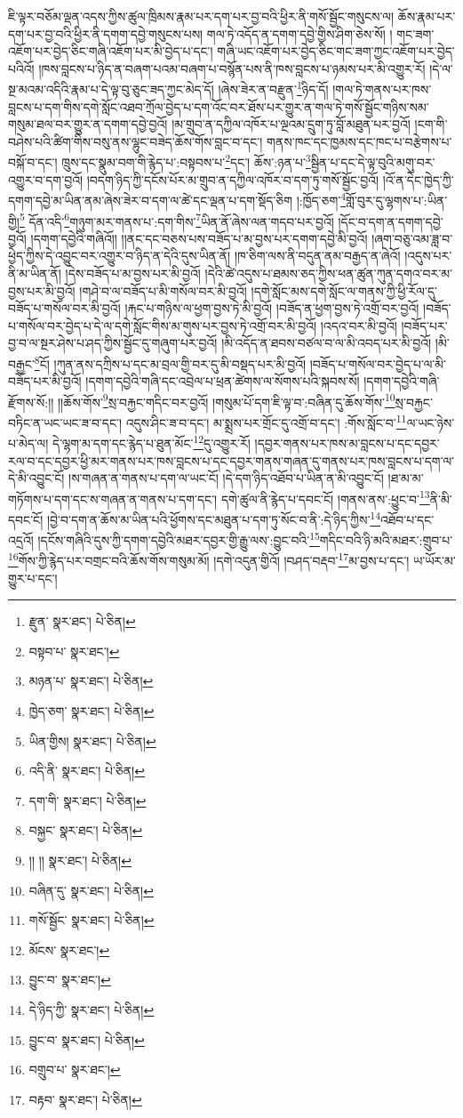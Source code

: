 ཇི་ལྟར་བཅོམ་ལྡན་འདས་ཀྱིས་ཚུལ་ཁྲིམས་རྣམ་པར་དག་པར་བྱ་བའི་ཕྱིར་ནི་གསོ་སྦྱོང་གསུངས་ལ། ཆོས་རྣམ་པར་དག་པར་བྱ་བའི་ཕྱིར་ནི་དགག་དབྱེ་གསུངས་པས། གལ་ཏེ་འདོད་ན་དགག་དབྱེ་གྱིས་ཤིག་ཅེས་སོ། །
གང་ཟག་འཇོག་པར་བྱེད་ཅིང་གཞི་འཇོག་པར་མི་བྱེད་པ་དང་། གཞི་ཡང་འཇོག་པར་བྱེད་ཅིང་གང་ཟག་ཀྱང་འཇོག་པར་བྱེད་པའིའོ། །ཁས་བླངས་པ་ཉིད་ན་བཞག་པའམ་བཞག་པ་བསྙོན་པས་ནི་ཁས་བླངས་པ་ཉམས་པར་མི་འགྱུར་རོ། །དེ་ལ་སྔ་མའམ་འདིའི་རྣམ་པ་དེ་ལྟ་བུ་ཅུང་ཟད་ཀྱང་མེད་དོ། །ཞེས་ཟེར་ན་བརྫུན་\footnote{རྫུན་  སྣར་ཐང་།  པེ་ཅིན། }ཉིད་དོ། །གལ་ཏེ་གནས་པར་ཁས་བླངས་པ་དག་གིས་དགེ་སློང་འཐབ་ཀྲོལ་བྱེད་པ་དག་འོང་བར་ཐོས་པར་གྱུར་ན་གལ་ཏེ་གསོ་སྦྱོང་གཉིས་སམ་གསུམ་ཐལ་བར་གྱུར་ན་དགག་དབྱེ་བྱའོ། །མ་གྲུབ་ན་དཀྱིལ་འཁོར་པ་ལྔའམ་དྲུག་ཏུ་བློ་མཐུན་པར་བྱའོ། །ངག་གི་བཤེས་པའི་ཚིག་གིས་བསུ་ནས་ལྷུང་བཟེད་ཆོས་གོས་བླང་བ་དང་། གནས་ཁང་དང་ཁྱམས་དང་ཁང་པ་བརྩེགས་པ་བསྐོ་བ་དང་། ཁྲུས་དང་སྣུམ་བག་གི་རྙེད་པ་:བསྟབས་པ་\footnote{བསྟབ་པ་  སྣར་ཐང་། }དང་། ཆོས་:ཉན་པ་\footnote{མཉན་པ་  སྣར་ཐང་།  པེ་ཅིན། }སྦྱིན་པ་དང་དེ་ལྟ་བུའི་མགུ་བར་འགྱུར་བ་དག་བྱའོ། །བདག་ཉིད་ཀྱི་དངོས་པོར་མ་གྲུབ་ན་དཀྱིལ་འཁོར་བ་དག་ཏུ་གསོ་སྦྱོང་བྱའོ། །འོ་ན་དེང་ཁྱེད་ཀྱི་དགག་དབྱེ་མ་ཡིན་ནམ་ཞེས་ཟེར་བ་དག་ལ་ཚེ་དང་ལྡན་པ་དག་སྡོད་ཅིག །:ཁྱོད་ཅག་\footnote{ཁྱེད་ཅག་  སྣར་ཐང་།  པེ་ཅིན། }གློ་བུར་དུ་ལྷགས་པ་:ཡིན་གྱི།\footnote{ཡིན་གྱིས།  སྣར་ཐང་།  པེ་ཅིན། } དོན་འདི་\footnote{འདི་ནི་  སྣར་ཐང་།  པེ་ཅིན། }གཉུག་མར་གནས་པ་:དག་གིས་\footnote{དག་གི་  སྣར་ཐང་།  པེ་ཅིན། }ཡིན་ནོ་ཞེས་ལན་གདབ་པར་བྱའོ། །དོང་བ་དག་ན་དགག་དབྱེ་བྱའོ། །དགག་དབྱེའི་གཞིའོ།། །།ནང་དང་བཅས་པས་བཟོད་པ་མ་བྱས་པར་དགག་དབྱེ་མི་བྱའོ། །ཞག་བཅུ་འམ་ཟླ་བ་ཕྱེད་ཀྱིས་དེ་འབྱུང་བར་འགྱུར་བ་ཉིད་ན་དེའི་དུས་ཡིན་ནོ། །ཁ་ཅིག་ལས་ནི་བདུན་ནམ་བརྒྱད་ན་ཞེའོ། །འདུས་པར་ནི་མ་ཡིན་ནོ། །དེས་བཟོད་པ་མ་བྱས་པར་མི་བྱའོ། །དེའི་ཚེ་འདུས་པ་ཐམས་ཅད་ཀྱིས་ཕན་ཚུན་ཀུན་དགའ་བར་མ་བྱས་པར་མི་བྱའོ། །གཤེ་བ་ལ་བཟོད་པ་མི་གསོལ་བར་མི་བྱའོ། །དགེ་སློང་མས་དགེ་སློང་ལ་གནས་ཀྱི་ཕྱི་རོལ་དུ་བཟོད་པ་གསོལ་བར་མི་བྱའོ། །རྐང་པ་གཉིས་ལ་ཕྱག་བྱས་ཏེ་མི་བྱའོ། །བཟོད་ན་ཕྱག་བྱས་ཏེ་འགྲོ་བར་བྱའོ། །བཟོད་པ་གསོལ་བར་བྱེད་པ་དེ་ལ་དགེ་སློང་གིས་མ་གུས་པར་བྱས་ཏེ་འགྲོ་བར་མི་བྱའོ། །འདའ་བར་མི་བྱའོ། །བཟོད་པར་བྱ་བ་ལ་སྔར་ཤེས་པ་ཤད་ཀྱིས་སྦྱོང་དུ་གཞུག་པར་བྱའོ། །མི་འདོད་ན་ཐབས་བཙལ་བ་ལ་མི་འབད་པར་མི་བྱའོ། །མི་བརྒྱང་\footnote{བསྐྱང་  སྣར་ཐང་།  པེ་ཅིན། }ངོ། །ཀུན་ནས་དཀྲིས་པ་དང་མ་བྲལ་གྱི་བར་དུ་མི་བསྡད་པར་མི་བྱའོ། །བཟོད་པ་གསོལ་བར་བྱེད་པ་ལ་མི་བཟོད་པར་མི་བྱའོ། །དགག་དབྱེའི་གཞི་དང་འབྲེལ་པ་ཕྲན་ཚེགས་ལ་སོགས་པའི་སྐབས་སོ། །དགག་དབྱེའི་གཞི་རྫོགས་སོ:།། །།ཆོས་གོས་\footnote{།། །།  སྣར་ཐང་།  པེ་ཅིན། }སྲ་བརྐྱང་གདིང་བར་བྱའོ། །གསུམ་པོ་དག་ཇི་ལྟ་བ་:བཞིན་དུ་ཆོས་གོས་\footnote{བཞིན་དུ་  སྣར་ཐང་།  པེ་ཅིན། }སྲ་བརྐྱང་བཏིང་ན་ཡང་ཡང་ཟ་བ་དང་། འདུས་ཤིང་ཟ་བ་དང་། མ་སྨྲས་པར་གྲོང་དུ་འགྲོ་བ་དང་། :གོས་སློང་བ་\footnote{གསོ་སྦྱོང་  སྣར་ཐང་།  པེ་ཅིན། }ལ་ཡང་ཉེས་པ་མེད་ལ། དེ་ལྷག་མ་དག་དང་རྙེད་པ་ཐུན་མོང་\footnote{མོངས་  སྣར་ཐང་། }དུ་འགྱུར་རོ། །དབྱར་གནས་པར་ཁས་མ་བླངས་པ་དང་དབྱར་རལ་བ་དང་དབྱར་ཕྱི་མར་གནས་པར་ཁས་བླངས་པ་དང་དབྱར་གནས་གཞན་དུ་གནས་པར་ཁས་བླངས་པ་དག་ལ་དེ་མི་འབྱུང་ངོ། །ས་གཞན་ན་གནས་པ་དག་ལ་ཡང་ངོ། །དེ་དག་ཉིད་འཐོབ་པ་ཡིན་ན་མི་འབྱུང་ངོ། །ཐ་མ་མ་གཏོགས་པ་དག་དང་ས་གཞན་ན་གནས་པ་དག་དང་། དགེ་ཚུལ་ནི་རྙེད་པ་དབང་ངོ། །གནས་ནས་:ཕྱུང་བ་\footnote{བྱུང་བ་  སྣར་ཐང་། }ནི་མི་དབང་ངོ། །བྱེ་བ་དག་ན་ཆོས་མ་ཡིན་པའི་ཕྱོགས་དང་མཐུན་པ་དག་ཏུ་སོང་བ་ནི་:དེ་ཉིད་ཀྱིས་\footnote{དེ་ཉིད་ཀྱི་  སྣར་ཐང་།  པེ་ཅིན། }འཐོབ་པ་དང་འདྲའོ། །དངོས་གཞིའི་དུས་ཀྱི་དགག་དབྱེའི་མཐར་དབྱར་གྱི་རྒྱུ་ལས་:བྱུང་བའི་\footnote{བྱུང་བ་  སྣར་ཐང་།  པེ་ཅིན། }གདིང་བའི་ཉི་མའི་མཐར་:གྲུབ་པ་\footnote{བགྲུབ་པ་  སྣར་ཐང་། }གོས་ཀྱི་རྙེད་པར་བགྲང་བའི་ཆོས་གོས་གསུམ་མོ། །དགེ་འདུན་གྱིའོ། །བཤད་བརྡབ་\footnote{བརྟབ་  སྣར་ཐང་།  པེ་ཅིན། }མ་བྱས་པ་དང་། ཡ་ཡོར་མ་གྱུར་པ་དང་། 
